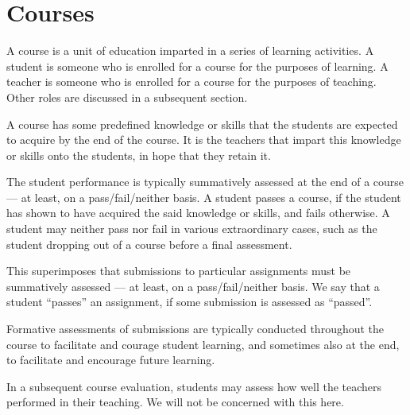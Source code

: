 
\section{Courses}

A course is a unit of education imparted in a series of learning activities. A
student is someone who is enrolled for a course for the purposes of learning.
A teacher is someone who is enrolled for a course for the purposes of teaching.
Other roles are discussed in a subsequent section.

A course has some predefined knowledge or skills that the students are expected
to acquire by the end of the course. It is the teachers that impart this
knowledge or skills onto the students, in hope that they retain it.

The student performance is typically summatively assessed at the end of a
course --- at least, on a pass/fail/neither basis. A student passes a course,
if the student has shown to have acquired the said knowledge or skills, and
fails otherwise.  A student may neither pass nor fail in various extraordinary
cases, such as the student dropping out of a course before a final assessment.

This superimposes that submissions to particular assignments must be
summatively assessed --- at least, on a pass/fail/neither basis. We say that a
student ``passes'' an assignment, if some submission is assessed as ``passed''.

Formative assessments of submissions are typically conducted throughout the
course to facilitate and courage student learning, and sometimes also at the
end, to facilitate and encourage future learning.

In a subsequent course evaluation, students may assess how well the teachers
performed in their teaching. We will not be concerned with this here.
